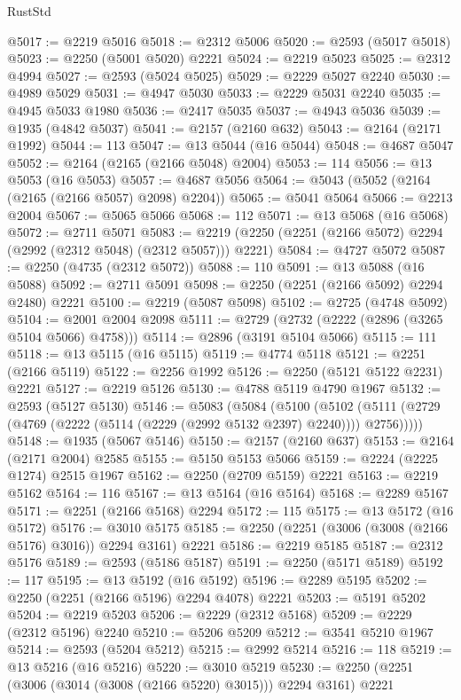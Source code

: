 \begin{lexlean}{RustStd}
\begin{coremodule}
{\begin{coremodule}
{{{{{{{{{{{{{{{{{{{{{{{{{{{{{{{{{{{{{{{{{{{{{{{{{{{{{@5017 := @2219 @5016
@5018 := @2312 @5006
@5020 := @2593 (@5017 @5018)
@5023 := @2250 (@5001 @5020) @2221
@5024 := @2219 @5023
@5025 := @2312 @4994
@5027 := @2593 (@5024 @5025)
@5029 := @2229 @5027 @2240
@5030 := @4989 @5029
@5031 := @4947 @5030
@5033 := @2229 @5031 @2240
@5035 := @4945 @5033 @1980
@5036 := @2417 @5035
@5037 := @4943 @5036
@5039 := @1935 (@4842 @5037)
@5041 := @2157 (@2160 @632)
@5043 := @2164 (@2171 @1992)
@5044 := 113
@5047 := @13 @5044 (@16 @5044)
@5048 := @4687 @5047
@5052 := @2164 (@2165 (@2166 @5048) @2004)
@5053 := 114
@5056 := @13 @5053 (@16 @5053)
@5057 := @4687 @5056
@5064 := @5043 (@5052 (@2164 (@2165 (@2166 @5057) @2098) @2204))
@5065 := @5041 @5064
@5066 := @2213 @2004
@5067 := @5065 @5066
@5068 := 112
@5071 := @13 @5068 (@16 @5068)
@5072 := @2711 @5071
@5083 := @2219 (@2250 (@2251 (@2166 @5072) @2294 (@2992 (@2312 @5048) (@2312 @5057))) @2221)
@5084 := @4727 @5072
@5087 := @2250 (@4735 (@2312 @5072))
@5088 := 110
@5091 := @13 @5088 (@16 @5088)
@5092 := @2711 @5091
@5098 := @2250 (@2251 (@2166 @5092) @2294 @2480) @2221
@5100 := @2219 (@5087 @5098)
@5102 := @2725 (@4748 @5092)
@5104 := @2001 @2004 @2098
@5111 := @2729 (@2732 (@2222 (@2896 (@3265 @5104 @5066) @4758)))
@5114 := @2896 (@3191 @5104 @5066)
@5115 := 111
@5118 := @13 @5115 (@16 @5115)
@5119 := @4774 @5118
@5121 := @2251 (@2166 @5119)
@5122 := @2256 @1992
@5126 := @2250 (@5121 @5122 @2231) @2221
@5127 := @2219 @5126
@5130 := @4788 @5119 @4790 @1967
@5132 := @2593 (@5127 @5130)
@5146 := @5083
    (@5084
      (@5100
        (@5102 (@5111 (@2729 (@4769 (@2222 (@5114 (@2229 (@2992 @5132 @2397) @2240)))) @2756)))))
@5148 := @1935 (@5067 @5146)
@5150 := @2157 (@2160 @637)
@5153 := @2164 (@2171 @2004) @2585
@5155 := @5150 @5153 @5066
@5159 := @2224 (@2225 @1274) @2515 @1967
@5162 := @2250 (@2709 @5159) @2221
@5163 := @2219 @5162
@5164 := 116
@5167 := @13 @5164 (@16 @5164)
@5168 := @2289 @5167
@5171 := @2251 (@2166 @5168) @2294
@5172 := 115
@5175 := @13 @5172 (@16 @5172)
@5176 := @3010 @5175
@5185 := @2250 (@2251 (@3006 (@3008 (@2166 @5176) @3016)) @2294 @3161) @2221
@5186 := @2219 @5185
@5187 := @2312 @5176
@5189 := @2593 (@5186 @5187)
@5191 := @2250 (@5171 @5189)
@5192 := 117
@5195 := @13 @5192 (@16 @5192)
@5196 := @2289 @5195
@5202 := @2250 (@2251 (@2166 @5196) @2294 @4078) @2221
@5203 := @5191 @5202
@5204 := @2219 @5203
@5206 := @2229 (@2312 @5168)
@5209 := @2229 (@2312 @5196) @2240
@5210 := @5206 @5209
@5212 := @3541 @5210 @1967
@5214 := @2593 (@5204 @5212)
@5215 := @2992 @5214
@5216 := 118
@5219 := @13 @5216 (@16 @5216)
@5220 := @3010 @5219
@5230 := @2250 (@2251 (@3006 (@3014 (@3008 (@2166 @5220) @3015))) @2294 @3161) @2221
}}}}}}}}}}}}}}}}}}}}}}}}}}}}}}}}}}}}}}}}}}}}}}}}}}}}}
\end{coremodule}}
\end{coremodule}
\end{lexlean}
